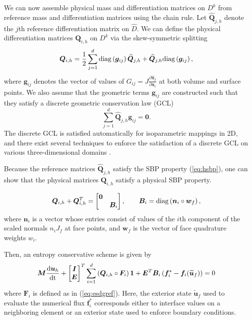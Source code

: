 \documentclass{svjour3}                     %
\renewcommand{\hat}{\widehat}
\renewcommand{\tilde}{\widetilde}
\newcommand{\diag}[1]{{\rm diag}\LRp{#1}}
\newcommand{\td}[2]{\frac{{\rm d}#1}{{\rm d}{\rm #2}}}
\newcommand{\pd}[2]{\frac{\partial#1}{\partial#2}}
\newcommand{\LRp}[1]{\left( #1 \right)}
\begin{document}
We can now assemble physical mass and differentiation matrices on $D^k$ from reference mass and differentiation matrices using the chain rule.  Let $\hat{\bm{Q}}_{j,h}$ denote the $j$th reference differentiation matrix on $\hat{D}$.  We can define the physical differentiation matrices $\bm{Q}_{i,h}$ on $D^k$ via the skew-symmetric splitting
\[
\bm{Q}_{i,h} = \frac{1}{2}\sum_{j=1}^d \diag{\bm{g}_{ij}}\hat{\bm{Q}}_{j,h} + \hat{\bm{Q}}_{j,h} \diag{\bm{g}_{ij}},
\]
where $\bm{g}_{ij}$ denotes the vector of values of $G_{ij} = J\pd{\hat{\bm{x}}_j}{\bm{x}_i}$ at both volume and surface points.  We also assume that the geometric terms $\bm{g}_{ij}$ are constructed such that they satisfy a discrete geometric conservation law (GCL)
\[
\sum_{j=1}^d \hat{\bm{Q}}_{j,h} \bm{g}_{ij} = \bm{0}.
\]
The discrete GCL is satisfied automatically for isoparametric mappings in 2D, and there exist several techniques to enforce the satisfaction of a discrete GCL on various three-dimensional domains \cite{thomas1979geometric, kopriva2006metric, crean2018entropy, chan2018discretely, kozdon2018energy, kopriva2019free}.  

Because the reference matrices $\hat{\bm{Q}}_{j,h}$ satisfy the SBP property (\ref{eq:hsbp}), one can show \cite{chan2018discretely} that the physical matrices $\bm{Q}_{i,h}$ satisfy a physical SBP property.  
\begin{lemma}
\label{lemma:Qhprops}

\[
\bm{Q}_{i,h} + \bm{Q}_{i,h}^T = \begin{bmatrix}
\bm{0} &\\
& \bm{B}_i \end{bmatrix}, \qquad \bm{B}_i = \diag{\bm{n}_i \circ \bm{w}_f},
\]
where $\bm{n}_i$ is a vector whose entries consist of values of the $i$th component of the scaled normals $n_iJ_f$ at face points, and $\bm{w}_f$ is the vector of face quadrature weights $w_i$.  
\end{lemma}


Then, an entropy conservative scheme is given by
\begin{gather}
{\bm{M}}\td{\bm{u}_h}{t} + \begin{bmatrix} \bm{I} \\ \bm{E} \end{bmatrix}^T
\sum_{i=1}^d \LRp{{\bm{Q}}_{i,h} \circ \bm{F}_i}\bm{1} + \bm{E}^T{\bm{B}}_i\LRp{\bm{f}_i^*-\bm{f}_i(\tilde{\bm{u}}_f)} = 0 \label{eq:esdg}
\end{gather}
where $\bm{F}_i$ is defined as in (\ref{eq:esdgref}).  Here, the exterior state $\tilde{\bm{u}}_f$ used to evaluate the numerical flux $\bm{f}_i^*$ corresponds either to interface values on a neighboring element or an exterior state used to enforce boundary conditions.
\end{document}
